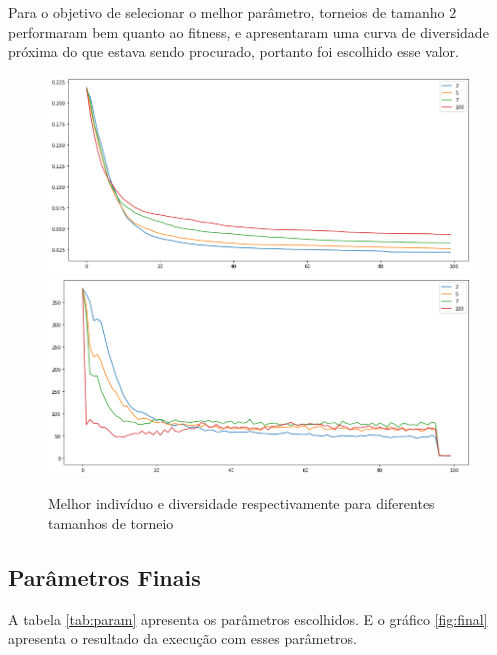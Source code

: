 \documentclass[10pt,twocolumn,letterpaper]{article}
\begin{document}
Para o objetivo de selecionar o melhor parâmetro, torneios de tamanho $2$ performaram bem quanto ao fitness, e apresentaram uma curva de diversidade próxima do que estava sendo procurado, portanto foi escolhido esse valor.


\begin{figure}[H]
   \begin{center}
   \includegraphics[width=\linewidth]{tourn_best.png}
   \includegraphics[width=\linewidth]{tourn_div.png}
   \end{center}
      \caption{Melhor indivíduo e diversidade respectivamente para diferentes tamanhos de torneio}
      \label{fig:tourn}
\end{figure}

\subsection{Parâmetros Finais}

A tabela \ref{tab:param} apresenta os parâmetros escolhidos. E o gráfico \ref{fig:final} apresenta o resultado da execução com esses parâmetros.
\end{document}
